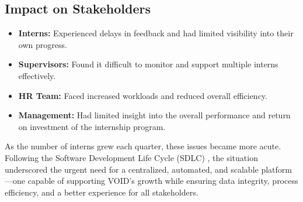 \subsection{Impact on Stakeholders}
\begin{itemize}
    \item \textbf{Interns:} Experienced delays in feedback and had limited visibility into their own progress.
    \item \textbf{Supervisors:} Found it difficult to monitor and support multiple interns effectively.
    \item \textbf{HR Team:} Faced increased workloads and reduced overall efficiency.
    \item \textbf{Management:} Had limited insight into the overall performance and return on investment of the internship program.
\end{itemize}

\noindent
As the number of interns grew each quarter, these issues became more acute. Following the Software Development Life Cycle (SDLC) \cite{geeksforgeeks2025sdlc}, the situation underscored the urgent need for a centralized, automated, and scalable platform—one capable of supporting VOID's growth while ensuring data integrity, process efficiency, and a better experience for all stakeholders.